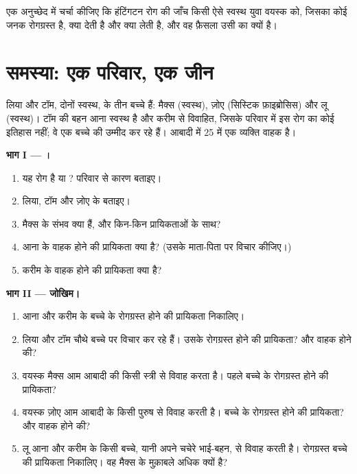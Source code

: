 \begin{exercise}[$\star\star\star$]\label{exo:g11:genes-and-disease:15}
एक अनुच्छेद में चर्चा कीजिए कि हंटिंगटन रोग की जाँच किसी ऐसे स्वस्थ युवा
वयस्क को, जिसका कोई जनक रोगग्रस्त है, क्या देती है और क्या लेती है, और वह
फ़ैसला उसी का क्यों है।
\end{exercise}

\section{समस्या: एक परिवार, एक जीन}

\begin{problem}[{सप्ताहांत समस्या --- सिस्टिक फ़ाइब्रोसिस वाले एक परिवार का
तीन पीढ़ियों तक पीछा: जीनप्ररूप सौंपे गए, हर सोचे हुए बच्चे के लिए जोखिम
निकाले गए, प्रयोगशाला की एक जाँच पढ़ी गई, और वाहकों की आबादी का गणित}]
\label{pb:g11:genes-and-disease:1}
लिया और टॉम, दोनों स्वस्थ, के तीन बच्चे हैं: मैक्स (स्वस्थ), ज़ोए (सिस्टिक
फ़ाइब्रोसिस) और लू (स्वस्थ)। टॉम की बहन आना स्वस्थ है और करीम से विवाहित,
जिसके परिवार में इस रोग का कोई इतिहास नहीं; वे एक बच्चे की उम्मीद कर रहे
हैं। आबादी में 25 में एक व्यक्ति वाहक है।

\medskip
\noindent\textbf{भाग I --- ।}
\begin{enumerate}
  \item यह रोग  है या ? परिवार से कारण बताइए।
  \item लिया, टॉम और ज़ोए के  बताइए।
  \item मैक्स के संभव  क्या हैं, और किन-किन प्रायिकताओं के साथ?
  \item आना के वाहक होने की प्रायिकता क्या है? (उसके माता-पिता पर विचार
        कीजिए।)
  \item करीम के वाहक होने की प्रायिकता क्या है?
\end{enumerate}

\medskip
\noindent\textbf{भाग II --- जोखिम।}
\begin{enumerate}[resume]
  \item आना और करीम के बच्चे के रोगग्रस्त होने की प्रायिकता निकालिए।
  \item लिया और टॉम चौथे बच्चे पर विचार कर रहे हैं। उसके रोगग्रस्त होने
        की प्रायिकता? और वाहक होने की?
  \item वयस्क मैक्स आम आबादी की किसी स्त्री से विवाह करता है। पहले बच्चे
        के रोगग्रस्त होने की प्रायिकता?
  \item वयस्क ज़ोए आम आबादी के किसी पुरुष से विवाह करती है। बच्चे के
        रोगग्रस्त होने की प्रायिकता? और वाहक होने की?
  \item लू आना और करीम के किसी बच्चे, यानी अपने चचेरे भाई-बहन, से विवाह
        करती है। रोगग्रस्त बच्चे की प्रायिकता निकालिए। वह मैक्स के
        मुक़ाबले अधिक क्यों है?
\end{enumerate}


\end{problem}
